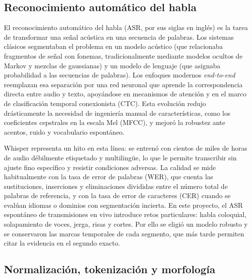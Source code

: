 \documentclass[12pt,a4paper]{article}
\begin{document}
\subsection{Reconocimiento automático del habla}

El reconocimiento automático del habla (ASR, por sus siglas en inglés) es la tarea de transformar una señal acústica en una secuencia de palabras. Los sistemas clásicos segmentaban el problema en un modelo acústico (que relacionaba fragmentos de señal con fonemas, tradicionalmente mediante modelos ocultos de Markov y mezclas de gaussianas) y un modelo de lenguaje (que asignaba probabilidad a las secuencias de palabras). Los enfoques modernos \emph{end-to-end} reemplazan esa separación por una red neuronal que aprende la correspondencia directa entre audio y texto, apoyándose en mecanismos de atención y en el marco de clasificación temporal conexionista (CTC). Esta evolución redujo drásticamente la necesidad de ingeniería manual de características, como los coeficientes cepstrales en la escala Mel (MFCC), y mejoró la robustez ante acentos, ruido y vocabulario espontáneo.

Whisper representa un hito en esta línea: se entrenó con cientos de miles de horas de audio débilmente etiquetado y multilingüe, lo que le permite transcribir sin ajuste fino específico y resistir condiciones adversas. La calidad se mide habitualmente con la tasa de error de palabras (WER), que cuenta las sustituciones, inserciones y eliminaciones divididas entre el número total de palabras de referencia, y con la tasa de error de caracteres (CER) cuando se evalúan idiomas o dominios con segmentación incierta. En este proyecto, el ASR espontáneo de transmisiones en vivo introduce retos particulares: habla coloquial, solapamiento de voces, jerga, risas y cortes. Por ello se eligió un modelo robusto y se conservaron las marcas temporales de cada segmento, que más tarde permiten citar la evidencia en el segundo exacto.

\subsection{Normalización, tokenización y morfología}
\end{document}
